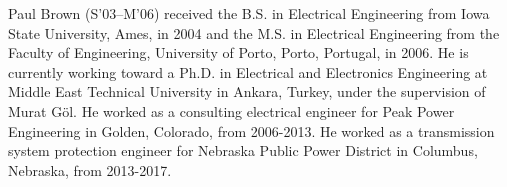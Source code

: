 \documentclass[conference,a4paper]{IEEEtran}[2015/08/26]
\begin{document}













\ifCLASSOPTIONcompsoc
\else
\fi







\begin{IEEEbiography}{Paul Brown}
	(S’03–M’06)
	received the B.S. in Electrical Engineering from Iowa State University, Ames, in 2004
	and the M.S. in Electrical Engineering from the Faculty of Engineering, University of Porto, Porto, Portugal, in 2006.
	He is currently working toward a Ph.D. in Electrical and Electronics Engineering at Middle East Technical University in Ankara, Turkey, under the supervision of Murat Göl.
	He worked as a consulting electrical engineer for Peak Power Engineering in Golden, Colorado, from 2006-2013.
	He worked as a transmission system protection engineer for Nebraska Public Power District in Columbus, Nebraska, from 2013-2017.
\end{IEEEbiography}
\end{document}
